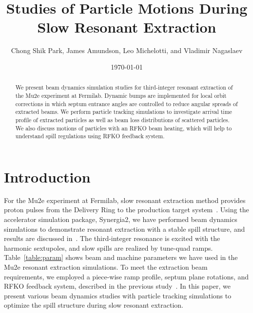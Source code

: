 \documentclass[aps,prstab,onecolumn,preprint]{revtex4-1}
\begin{document}
\title{Studies of Particle Motions During Slow Resonant Extraction}
\author{Chong Shik Park, James Amundson, Leo Michelotti, and Vladimir Nagaslaev}
\date{\today}

\begin{abstract}
We present beam dynamics simulation studies for third-integer resonant extraction of the Mu2e experiment at Fermilab. Dynamic bumps are implemented for local orbit corrections in which septum entrance angles are controlled to reduce angular spreads of extracted beams. We perform particle tracking simulations to investigate arrival time profile of extracted particles as well as beam loss distributions of scattered particles. We also discuss motions of particles with an RFKO beam heating, which will help to understand spill regulations using RFKO feedback system.
\end{abstract}

\pacs{}
\maketitle

\setcounter{tocdepth}{7}


\section{\label{sec:intro}Introduction}

For the Mu2e experiment at Fermilab, slow resonant extraction method provides proton pulses from the Delivery Ring to the production target system~\cite{tdr}. Using the accelerator simulation package, Synergia2, we have performed beam dynamics simulations to demonstrate resonant extraction with a stable spill structure, and results are discussed in~\cite{mu2e}. The third-integer resonance is excited with the harmonic sextupoles, and slow spills are realized by tune-quad ramps. Table~\ref{table:param} shows beam and machine parameters we have used in the Mu2e resonant extraction simulations. To meet the extraction beam requirements, we employed a piece-wise ramp profile, septum plane rotations, and RFKO feedback system, described in the previous study~\cite{mu2e}. In this paper, we present various beam dynamics studies with particle tracking simulations to optimize the spill structure during slow resonant extraction. 
\end{document}
